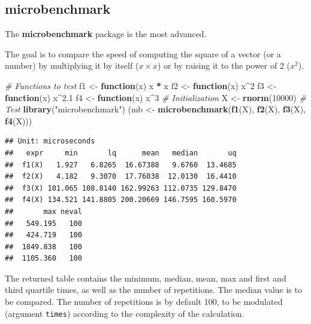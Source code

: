 \documentclass[
  12pt,
  american,
  a4paper,
  extrafontsizes,onecolumn,openright
  ]{memoir}
\newenvironment{Shaded}{\begin{snugshade}}{\end{snugshade}}
\newcommand{\CommentTok}[1]{\textcolor[rgb]{0.56,0.35,0.01}{\textit{#1}}}
\newcommand{\ControlFlowTok}[1]{\textcolor[rgb]{0.13,0.29,0.53}{\textbf{#1}}}
\newcommand{\DecValTok}[1]{\textcolor[rgb]{0.00,0.00,0.81}{#1}}
\newcommand{\FloatTok}[1]{\textcolor[rgb]{0.00,0.00,0.81}{#1}}
\newcommand{\FunctionTok}[1]{\textcolor[rgb]{0.13,0.29,0.53}{\textbf{#1}}}
\newcommand{\NormalTok}[1]{#1}
\newcommand{\OtherTok}[1]{\textcolor[rgb]{0.56,0.35,0.01}{#1}}
\newcommand{\SpecialCharTok}[1]{\textcolor[rgb]{0.81,0.36,0.00}{\textbf{#1}}}
\newcommand{\StringTok}[1]{\textcolor[rgb]{0.31,0.60,0.02}{#1}}
\begin{document}
\normalsize

\subsection{microbenchmark}\label{microbenchmark}

The \textbf{microbenchmark} package is the most advanced.

The goal is to compare the speed of computing the square of a vector (or a number) by multiplying it by itself (\(x \times x\)) or by raising it to the power of 2 (\(x^2\)).

\scriptsize

\begin{Shaded}
\begin{Highlighting}[]
\CommentTok{\# Functions to test}
\NormalTok{f1 }\OtherTok{\textless{}{-}} \ControlFlowTok{function}\NormalTok{(x) x }\SpecialCharTok{*}\NormalTok{ x}
\NormalTok{f2 }\OtherTok{\textless{}{-}} \ControlFlowTok{function}\NormalTok{(x) x}\SpecialCharTok{\^{}}\DecValTok{2}
\NormalTok{f3 }\OtherTok{\textless{}{-}} \ControlFlowTok{function}\NormalTok{(x) x}\SpecialCharTok{\^{}}\FloatTok{2.1}
\NormalTok{f4 }\OtherTok{\textless{}{-}} \ControlFlowTok{function}\NormalTok{(x) x}\SpecialCharTok{\^{}}\DecValTok{3}
\CommentTok{\# Initialization}
\NormalTok{X }\OtherTok{\textless{}{-}} \FunctionTok{rnorm}\NormalTok{(}\DecValTok{10000}\NormalTok{)}
\CommentTok{\# Test}
\FunctionTok{library}\NormalTok{(}\StringTok{"microbenchmark"}\NormalTok{)}
\NormalTok{(mb }\OtherTok{\textless{}{-}} \FunctionTok{microbenchmark}\NormalTok{(}\FunctionTok{f1}\NormalTok{(X), }\FunctionTok{f2}\NormalTok{(X), }\FunctionTok{f3}\NormalTok{(X), }\FunctionTok{f4}\NormalTok{(X)))}
\end{Highlighting}
\end{Shaded}

\begin{verbatim}
## Unit: microseconds
##   expr     min       lq      mean   median       uq
##  f1(X)   1.927   6.8265  16.67388   9.6760  13.4685
##  f2(X)   4.182   9.3070  17.76038  12.0130  16.4410
##  f3(X) 101.065 108.8140 162.99263 112.0735 129.8470
##  f4(X) 134.521 141.8805 200.20669 146.7595 160.5970
##       max neval
##   549.195   100
##   424.719   100
##  1849.838   100
##  1105.360   100
\end{verbatim}

\normalsize

The returned table contains the minimum, median, mean, max and first and third quartile times, as well as the number of repetitions.
The median value is to be compared.
The number of repetitions is by default 100, to be modulated (argument \texttt{times}) according to the complexity of the calculation.
\end{document}
